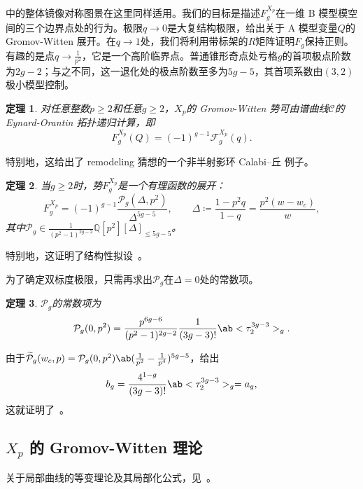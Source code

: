 \documentclass{amsart}
\newtheorem{thm}{定理}[section]
\theoremstyle{definition}
\theoremstyle{remark}
\theoremstyle{plain}
\theoremstyle{definition}
\theoremstyle{remark}
\newcommand{\Q}{\mathbb{Q}}
\newcommand{\mc}[1]{\mathcal{#1}}
\newcommand{\wt}[1]{\widetilde{#1}}
\newcommand{\1}{\mathbf{1}}
\newcommand{\2}{\mathbf{2}}
\newcommand{\3}{\mathbf{3}}
\begin{document}
中的整体镜像对称图景在这里同样适用。我们的目标是描述\(F_g^{X_p}\)在一维 B 模型模空间的三个边界点处的行为。极限\(q \to 0\)是大复结构极限，给出关于 A 模型变量\(Q\)的 Gromov-Witten 展开。在\(q \to 1\)处，我们将利用带标架的\(R\)矩阵证明\(F_g\)保持正则。有趣的是点\(q \to \frac{1}{p^2}\)，它是一个高阶临界点。普通锥形奇点处亏格\(g\)的首项极点阶数为\(2g-2\)；与之不同，这一退化处的极点阶数至多为\(5g-5\)，其首项系数由\((3,2)\)极小模型控制。

\begin{thm}%
\label{thm:local P1 mirror symmetry}
    对任意整数\(p \geq 2\)和任意\(g \geq 2\)，\(X_p\)的 Gromov-Witten 势可由谱曲线\(\mc{C}\)的 Eynard-Orantin 拓扑递归计算，即
    \[ F_g^{X_p}(Q) = (-1)^{g-1}\mc{F}_g^{X_p}(q). \]
\end{thm}

特别地，这给出了 remodeling 猜想的一个非半射影环 Calabi--丘 例子。

\begin{thm}%
\label{thm:local P1 rationality}
    当\(g \geq 2\)时，势\(F_g^{X_p}\)是一个有理函数的展开：
    \[ F_g^{X_p} = (-1)^{g-1}\frac{\mc{P}_g(\Delta,p^2)}{\Delta^{5g-5}}, \qquad \Delta \coloneqq \frac{1-p^2q}{1-q} = \frac{p^2(w-w_c)}{w}, \]
    其中\(\mc{P}_g \in \frac{1}{(p^2-1)^{2g-2}}\Q[p^2][\Delta]_{\leq 5g-5}\)。
\end{thm}

特别地，这证明了结构性拟设~。

为了确定双标度极限，只需再求出\(\mc{P}_g\)在\(\Delta = 0\)处的常数项。

\begin{thm}%
\label{thm:local P1 constant term}
    \(\mc{P}_g\)的常数项为
    \[ \mc{P}_g(0,p^2) = \frac{p^{6g-6}}{(p^2-1)^{2g-2}}\frac{1}{(3g-3)!}\ab<\tau_2^{3g-3}>_g. \]
\end{thm}

由于\(\wt{\mc{P}}_g(w_c,p) = \mc{P}_g(0,p^2)\ab(\frac{1}{p^2}-\frac{1}{p^4})^{5g-5}\)，给出
\[ b_g = \frac{4^{1-g}}{(3g-3)!}\ab<\tau_2^{3g-3}>_g = a_g, \]
这就证明了~。

\subsection{\(X_p\) 的 Gromov-Witten 理论}%
\label{sub:Gromov-Witten theory of Xp}

关于局部曲线的等变理论及其局部化公式，见~\cite{BryanPandharipande2008}。
\end{document}
